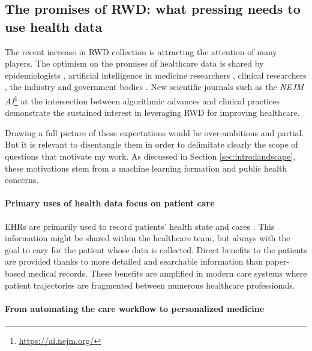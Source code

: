 \documentclass[french,12pt,twoside,a4paper]{book}
\begin{document}
\subsection{The promises of RWD: what pressing needs to use health data}

The recent increase in RWD collection is attracting the attention of many
players. The optimism on the promises of healthcare data is shared by
epidemiologists \citep{mooney2015epidemiology,hernan_using_2016}, artificial
intelligence in medicine researchers \citep{schwartz1987artificial,
  yu2018artificial}, clinical researchers
\citep{schwalbe2020artificial,dzau2023anticipating}, the industry
\citep{pfizer2019rwd,iqvia2023rwd} and government bodies
\citep{mcginnis2013best,fda_real_2018,ema2023rwd}. New scientific journals such
as the \emph{NEJM AI}\footnote{\url{https://ai.nejm.org/}} \citep{beam_2023} at
the intersection between algorithmic advances and clinical practices demonstrate
the sustained interest in leveraging RWD for improving healthcare.

Drawing a full picture of these expectations would be over-ambitious and
partial. But it is relevant to disentangle them in order to delimitate
clearly the scope of questions that motivate my work. As discussed in Section
\ref{sec:intro:landscape}, these motivations stem from a machine learning
formation and public health concerns.

\paragraph{Primary uses of health data focus on patient care}

EHRs are primarily used to record patients' health state and cares
\citep{safran_toward_2007,eu_primary_2022}. This information might be shared
within the healthcare team, but always with the goal to cary for the patient
whose data is collected. Direct benefits to the patients are provided thanks to
more detailed and searchable information than paper-based medical records. These
benefits are amplified in modern care systems where patient trajectories are
fragmented between numerous healthcare professionals.


\paragraph{From automating the care workflow to personalized medicine}
\end{document}
